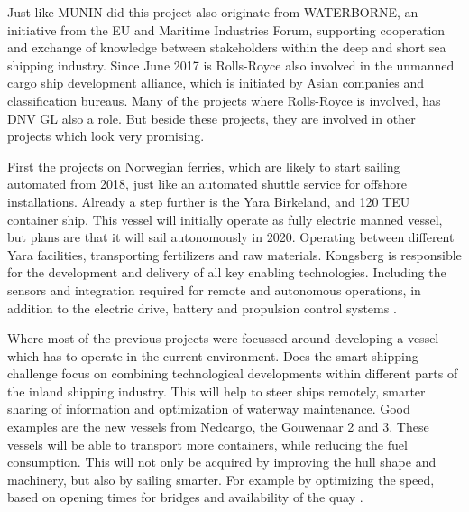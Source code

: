 Just like MUNIN did this project also originate from WATERBORNE, an initiative from the EU and Maritime Industries Forum, supporting cooperation and exchange of knowledge between stakeholders within the deep and short sea shipping industry. Since June 2017 is Rolls-Royce also involved in the unmanned cargo ship development alliance, which is initiated by Asian companies and classification bureaus. Many of the projects where Rolls-Royce is involved, has DNV GL also a role. But beside these projects, they are involved in other projects which look very promising.

First the projects on Norwegian ferries, which are likely to start sailing automated from 2018, just like an automated shuttle service for offshore installations. 
Already a step further is the Yara Birkeland, and 120 \ac{TEU} container ship. This vessel will initially operate as fully electric manned vessel, but plans are that it will sail autonomously in 2020. Operating between different Yara facilities, transporting fertilizers and raw materials. 
Kongsberg is responsible for the development and delivery of all key enabling technologies. Including the sensors and integration required for remote and autonomous operations, in addition to the electric drive, battery and propulsion control systems \cite{Sames2017}.

Where most of the previous projects were focussed around developing a vessel which has to operate in the current environment. Does the smart shipping challenge focus on combining technological developments within different parts of the inland shipping industry. This will help to steer ships remotely, smarter sharing of information and optimization of waterway maintenance.
Good examples are the new vessels from Nedcargo, the Gouwenaar 2 and 3. These vessels will be able to transport more containers, while reducing the fuel consumption. This will not only be acquired by improving the hull shape and machinery, but also by sailing smarter. For example by optimizing the speed, based on opening times for bridges and availability of the quay \cite{SMASH2017}. 



